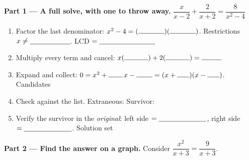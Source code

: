 \documentclass[10pt]{article}
\begin{document}
\begin{tcolorbox}[colback=white, colframe=black!40, title=\textbf{Tier A --- Approaching Proficiency},
    fonttitle=\bfseries, arc=1.5mm, left=3mm, right=3mm, top=2mm, bottom=2mm, breakable]
\textbf{Part 1 --- A full solve, with one to throw away.} \;
$\dfrac{x}{x-2}+\dfrac{2}{x+2}=\dfrac{8}{x^2-4}$
\begin{enumerate}[label=\arabic*., leftmargin=2.1em, itemsep=5pt]
  \item Factor the last denominator: $x^2-4=(\rule{1.3cm}{0.4pt})(\rule{1.3cm}{0.4pt})$. \;
        Restrictions $x\neq\blank{2.0cm}$. \; LCD $=\blank{2.8cm}$
  \item Multiply every term and cancel: \;
        $x(\rule{1.2cm}{0.4pt})+2(\rule{1.2cm}{0.4pt})=\rule{1.0cm}{0.4pt}$
  \item Expand and collect: \; $0=x^2+\rule{0.7cm}{0.4pt}\,x-\rule{0.8cm}{0.4pt}
        =(x+\rule{0.6cm}{0.4pt})(x-\rule{0.6cm}{0.4pt})$. \; Candidates \blank{2.4cm}
  \item Check against the list. Extraneous: \blank{1.4cm} \; Survivor: \blank{1.4cm}
  \item Verify the survivor in the \emph{original}: left side $=\blank{2.4cm}$, right side
        $=\blank{2.4cm}$. \; Solution set \blank{1.8cm}
\end{enumerate}

\vspace{5pt}
\textbf{Part 2 --- Find the answer on a graph.} Consider $\dfrac{x^2}{x+3}=\dfrac{9}{x+3}$.


\end{tcolorbox}
\end{document}
